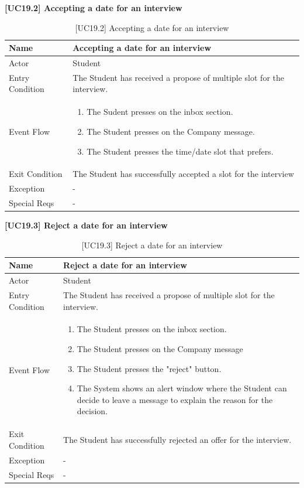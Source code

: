 \textbf{[UC19.2] Accepting a date for an interview}
\begin{table}[H] %
    \centering
    \begin{tabular}{|p{3cm}|p{10cm}|}
    \hline
    Name & Accepting a date for an interview \\ \hline
    Actor  & Student \\ \hline
    Entry Condition  & The Student has received a propose of multiple slot for the interview. \\ \hline
    Event Flow  & 
    \begin{enumerate}[noitemsep, topsep=0pt]
        \item The Sudent presses on the inbox section.
        \item The Student presses on the Company message.
        \item The Student presses the time/date slot that prefers.
    \end{enumerate}
    \\ \hline
    Exit Condition  & The Student has successfully accepted a slot for the interview \\ \hline
    Exception  & - \\ \hline
    Special Reqs  & - \\ \hline
    \end{tabular}
    \caption{[UC19.2] Accepting a date for an interview}
\end{table}

\textbf{[UC19.3] Reject a date for an interview}
\begin{table}[H] %
    \centering
    \begin{tabular}{|p{3cm}|p{10cm}|}
    \hline
    Name & Reject a date for an interview \\ \hline
    Actor  & Student \\ \hline
    Entry Condition  & The Student has received a propose of multiple slot for the interview. \\ \hline
    Event Flow  & 
    \begin{enumerate}[noitemsep, topsep=0pt]
        \item The Student presses on the inbox section.
        \item The Student presses on the Company message
        \item The Student presses the "reject" button.
        \item The System shows an alert window where the Student can decide to leave a message to explain the reason for the decision.
    \end{enumerate}
    \\ \hline
    Exit Condition  & The Student has successfully rejected an offer for the interview. \\ \hline
    Exception  & - \\ \hline
    Special Reqs  & - \\ \hline
    \end{tabular}
    \caption{[UC19.3] Reject a date for an interview}
\end{table}

